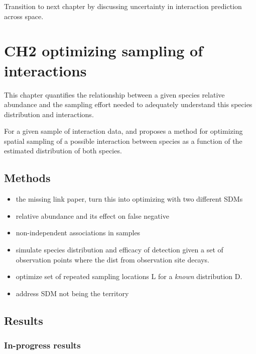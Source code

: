 \documentclass[10pt,oneside]{article}
\begin{document}
Transition to next chapter by discussing uncertainty in interaction
prediction across space.

\hypertarget{ch2-optimizing-sampling-of-interactions}{%
\section{CH2 optimizing sampling of
interactions}\label{ch2-optimizing-sampling-of-interactions}}

This chapter quantifies the relationship between a given species
relative abundance and the sampling effort needed to adequately
understand this species distribution and interactions.

For a given sample of interaction data, and proposes a method for
optimizing spatial sampling of a possible interaction between species as
a function of the estimated distribution of both species.

\hypertarget{methods-1}{%
\subsection{Methods}\label{methods-1}}

\begin{itemize}
\item
  the missing link paper, turn this into optimizing with two different
  SDMs
\item
  relative abundance and its effect on false negative
\item
  non-independent associations in samples
\item
  simulate species distribution and efficacy of detection given a set of
  observation points where the dist from observation site decays.
\item
  optimize set of repeated sampling locations L for a \emph{known}
  distribution D.
\item
  address SDM not being the territory
\end{itemize}

\hypertarget{results}{%
\subsection{Results}\label{results}}

\hypertarget{in-progress-results}{%
\subsubsection{In-progress results}\label{in-progress-results}}
\end{document}
